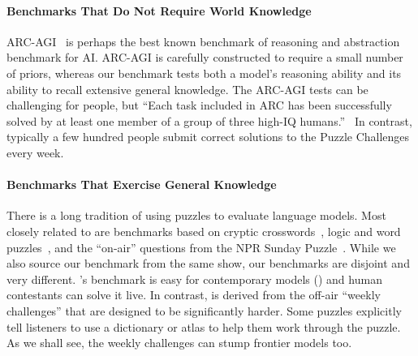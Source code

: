 \paragraph{Benchmarks That Do Not Require World Knowledge}
ARC-AGI~\citep{chollet:arc-agi} is perhaps the best known benchmark of reasoning and abstraction benchmark for AI. ARC-AGI is carefully constructed to require a small number of priors, whereas our benchmark 
tests both a model's reasoning ability and its ability to recall extensive general knowledge. The ARC-AGI tests can be challenging for people, but
``Each task included in ARC has been successfully solved by at least one member of a group of three high-IQ humans.''~\citep{chollet:arc-agi} In contrast, typically a few hundred people submit correct solutions to the Puzzle Challenges every week.


\paragraph{Benchmarks That Exercise General Knowledge}

There is a long tradition of using puzzles to evaluate language models. Most closely related to \benchmark{} are benchmarks based on cryptic crosswords~\citep{rozner:cryptic-crosswords}, logic and word puzzles~\citep{jiang:brainteaser,tyagi-etal-2024-step,connections}, and the ``on-air'' questions from the NPR Sunday Puzzle~\citep{zhao:puzzleqa}. While we also source our benchmark from the same show, our benchmarks are disjoint and very different. \citet{zhao:puzzleqa}'s benchmark is  easy for contemporary models () and human contestants can solve it live.  In contrast, \benchmark{} is derived from the off-air ``weekly challenges'' that are designed to be significantly harder. Some puzzles explicitly tell listeners to use a dictionary or atlas to help them work through the puzzle. As we shall see, the weekly challenges can stump frontier models too.